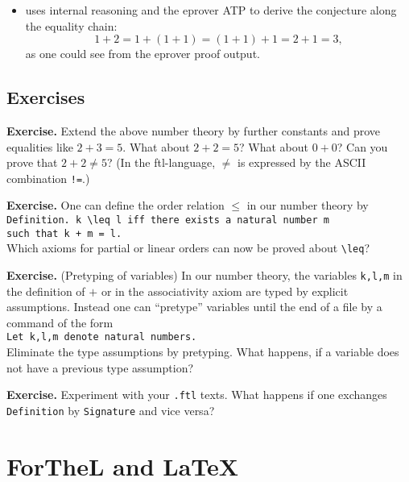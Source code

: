 \documentclass[11pt]{article}
\newenvironment{exercise}{\noindent\textbf{Exercise. }}{\par}
\begin{document}
\begin{itemize}
\item \Naproche{} uses internal reasoning and the eprover ATP to
derive the conjecture
along the equality chain:
$$1 + 2 = 1 + (1 + 1) = (1 + 1) + 1 = 2 + 1 = 3,$$
as one could see from the eprover proof output.
\end{itemize}

\subsection{Exercises}

\begin{exercise}
Extend the above number theory by further constants and prove
equalities like $2 + 3 = 5$. What about $2 + 2 = 5$? What about
$0+0$? Can
you prove that $2 + 2 \neq 5$? (In the ftl-language, $\neq$ is expressed
by the ASCII combination \verb+!=+.)
\end{exercise}

\begin{exercise}
One can define the order relation $\leq$ in our number theory
by\\
\verb/Definition. k \leq l iff there exists a natural number m/\\
\verb/such that k + m = l./\\
Which axioms for partial or linear orders can now be proved about
\verb+\leq+?
\end{exercise}

\begin{exercise} (Pretyping of variables) In our number theory,
the variables \verb+k,l,m+ in the definition of $+$ or in the
associativity axiom are typed by explicit assumptions. Instead one
can ``pretype'' variables until the end of a file by a command of
the form\\
\verb+Let k,l,m denote natural numbers.+\\
Eliminate the type assumptions by pretyping.
What happens, if a variable does not have a previous
type assumption?
\end{exercise}

\begin{exercise} Experiment with your \verb+.ftl+ texts.
What happens if one exchanges \verb+Definition+ by
\verb+Signature+ and vice versa?
\end{exercise}

\section{ForTheL and \LaTeX}
\end{document}
